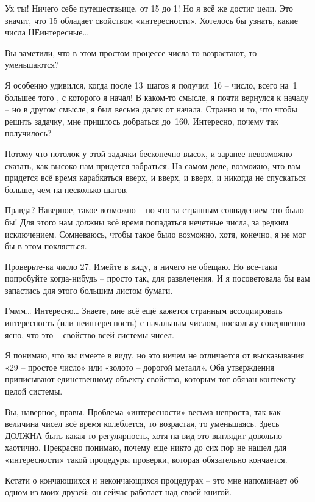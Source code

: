 \documentclass[../main.tex]{subfiles}
\begin{document}
\begin{dialogue}
Ух ты! Ничего себе путешествьице, от 15 до 1! Но я всё же достиг цели. Это значит, что 15 обладает свойством «интересности». Хотелось бы узнать, какие числа НЕинтересные\ldots{}

 Вы заметили, что в этом простом процессе числа то возрастают, то уменьшаются?

 Я особенно удивился, когда после 13~шагов я получил~16 \--- число, всего на~1 большее того , с которого я начал! В каком-то смысле, я почти вернулся к началу \--- но в другом смысле, я был весьма далек от начала. Странно и то, что чтобы решить задачку, мне пришлось добраться до~160. Интересно, почему так получилось?

 Потому что потолок у этой задачки бесконечно высок, и заранее невозможно сказать, как высоко нам придется забраться. На самом деле, возможно, что вам придется всё время карабкаться вверх, и вверх, и вверх, и никогда не спускаться больше, чем на несколько шагов.

 Правда? Наверное, такое возможно \--- но что за странным совпадением это было бы! Для этого нам должны всё время попадаться нечетные числа, за редким исключением. Сомневаюсь, чтобы такое было возможно, хотя, конечно, я не мог бы в этом поклясться.

 Проверьте-ка число 27. Имейте в виду, я ничего не обещаю. Но все-таки попробуйте когда-нибудь \--- просто так, для развлечения. И я посоветовала бы вам запастись для этого большим листом бумаги.

 Гммм\ldots{} Интересно\ldots{} Знаете, мне всё ещё кажется странным ассоциировать интересность (или неинтересность) с начальным числом, поскольку совершенно ясно, что это \--- свойство всей системы чисел.

 Я понимаю, что вы имеете в виду, но это ничем не отличается от высказывания «29 \--- простое число» или «золото \--- дорогой металл». Оба утверждения приписывают единственному объекту свойство, которым тот обязан контексту целой системы.

 Вы, наверное, правы. Проблема «интересности» весьма непроста, так как величина чисел всё время колеблется, то возрастая, то уменьшаясь. Здесь ДОЛЖНА быть какая-то регулярность, хотя на вид это выглядит довольно хаотично. Прекрасно понимаю, почему еще никто до сих пор не нашел для «интересности» такой процедуры проверки, которая обязательно кончается.

 Кстати о кончающихся и некончающихся процедурах \--- это мне напоминает об одном из моих друзей; он сейчас работает над своей книгой.


\end{dialogue}
\end{document}
